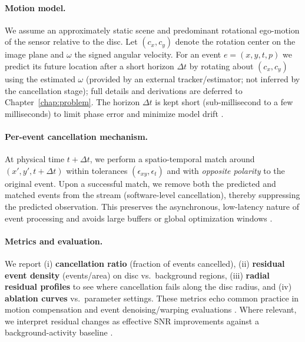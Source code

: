 \paragraph{Motion model.}
We assume an approximately static scene and predominant rotational ego-motion of the sensor relative to the disc. Let $(c_x,c_y)$ denote the rotation center on the image plane and $\omega$ the signed angular velocity. For an event $e=(x,y,t,p)$ we predict its future location after a short horizon $\Delta t$ by rotating about $(c_x,c_y)$ using the estimated $\omega$ (provided by an external tracker/estimator; not inferred by the cancellation stage); full details and derivations are deferred to Chapter~\ref{chap:problem}. The horizon $\Delta t$ is kept short (sub-millisecond to a few milliseconds) to limit phase error and minimize model drift \cite{Gallego2017Angular,Gallego2018CMax}.

\paragraph{Per-event cancellation mechanism.}
At physical time $t+\Delta t$, we perform a spatio-temporal match around $(x',y',t+\Delta t)$ within tolerances $(\epsilon_{xy},\epsilon_{t})$ and with \emph{opposite polarity} to the original event. Upon a successful match, we remove both the predicted and matched events from the stream (software-level cancellation), thereby suppressing the predicted observation. This preserves the asynchronous, low-latency nature of event processing and avoids large buffers or global optimization windows \cite{Bardow2016SOFIE,Gallego2018CMax}.

\paragraph{Metrics and evaluation.}
We report (i) \textbf{cancellation ratio} (fraction of events cancelled), (ii) \textbf{residual event density} (events/area) on disc vs.\ background regions, (iii) \textbf{radial residual profiles} to see where cancellation fails along the disc radius, and (iv) \textbf{ablation curves} vs.\ parameter settings. These metrics echo common practice in motion compensation and event denoising/warping evaluations \cite{Bardow2016SOFIE,Gallego2018CMax,Xu2020TCI}. Where relevant, we interpret residual changes as effective SNR improvements against a background-activity baseline \cite{Gallego2020Survey}.

